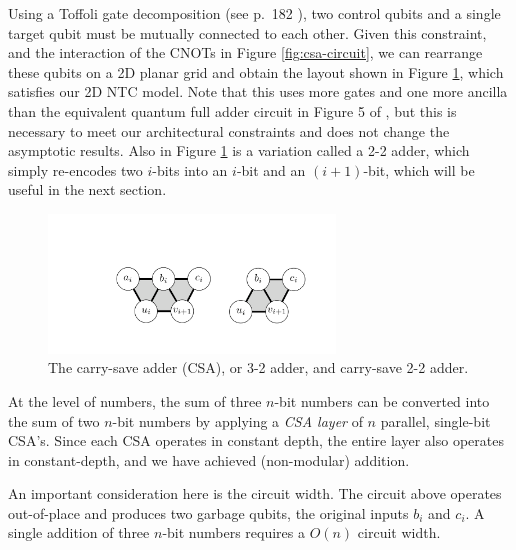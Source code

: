 Using a Toffoli gate decomposition (see p.~182 \cite{Nielsen2000}), two control
qubits and a single target qubit must be
mutually connected to each other. Given this constraint, and the
interaction of the CNOTs in Figure \ref{fig:csa-circuit}, we can
rearrange these qubits on a 2D planar grid and obtain the layout shown
in Figure \ref{fig:csa-3-2}, which satisfies our 2D NTC model.
Note that this uses more gates and one more ancilla than the equivalent
quantum full adder circuit in Figure 5 of \cite{Gossett1998}, but this
is necessary to meet our architectural constraints and does not change the
asymptotic results.
Also in Figure \ref{fig:csa-3-2}
is a variation called a 2-2 adder, which simply re-encodes two $i$-bits
into an $i$-bit and an $(i+1)$-bit, which will be useful in the next section.

\begin{figure}[b!]
\begin{center}
\includegraphics[width=3in]{./figures/csa-32-22.pdf}
\end{center}
\caption{The carry-save adder (CSA), or 3-2 adder, and carry-save 2-2 adder.}
\label{fig:csa-3-2}
\end{figure}

At the level of numbers, the sum of three $n$-bit numbers can be converted into
the sum of two $n$-bit numbers by applying a \emph{CSA layer} of
$n$ parallel, single-bit
CSA's. Since each CSA operates in constant depth, the entire layer also
operates in constant-depth, and we have achieved (non-modular) addition.

An important consideration here is the circuit width. The circuit above
operates out-of-place and produces two garbage qubits, the original inputs
$b_i$ and $c_i$. A single addition of three $n$-bit numbers requires a
$O(n)$ circuit width.
